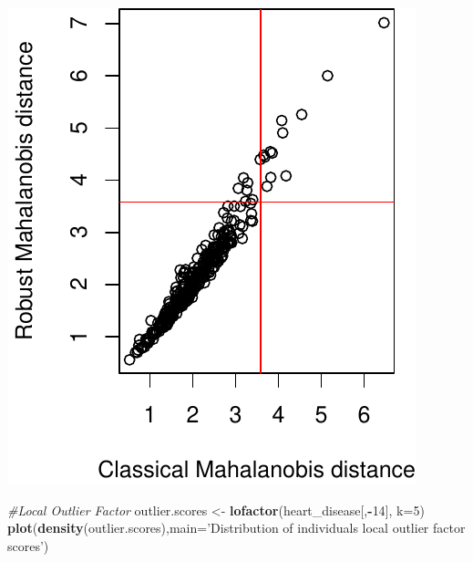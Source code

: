 \documentclass[]{article}
\newenvironment{Shaded}{\begin{snugshade}}{\end{snugshade}}
\newcommand{\KeywordTok}[1]{\textcolor[rgb]{0.13,0.29,0.53}{\textbf{#1}}}
\newcommand{\DataTypeTok}[1]{\textcolor[rgb]{0.13,0.29,0.53}{#1}}
\newcommand{\DecValTok}[1]{\textcolor[rgb]{0.00,0.00,0.81}{#1}}
\newcommand{\StringTok}[1]{\textcolor[rgb]{0.31,0.60,0.02}{#1}}
\newcommand{\CommentTok}[1]{\textcolor[rgb]{0.56,0.35,0.01}{\textit{#1}}}
\newcommand{\OperatorTok}[1]{\textcolor[rgb]{0.81,0.36,0.00}{\textbf{#1}}}
\newcommand{\NormalTok}[1]{#1}
\begin{document}
\begin{Shaded}
\end{Shaded}

\includegraphics{project_report_files/figure-latex/unnamed-chunk-4-2.pdf}

\begin{Shaded}
\begin{Highlighting}[]
\CommentTok{#Local Outlier Factor}
\NormalTok{outlier.scores <-}\StringTok{ }\KeywordTok{lofactor}\NormalTok{(heart_disease[,}\OperatorTok{-}\DecValTok{14}\NormalTok{], }\DataTypeTok{k=}\DecValTok{5}\NormalTok{)}
\KeywordTok{plot}\NormalTok{(}\KeywordTok{density}\NormalTok{(outlier.scores),}\DataTypeTok{main=}\StringTok{'Distribution of individuals local outlier factor scores'}\NormalTok{)}
\end{Highlighting}
\end{Shaded}
\end{document}

